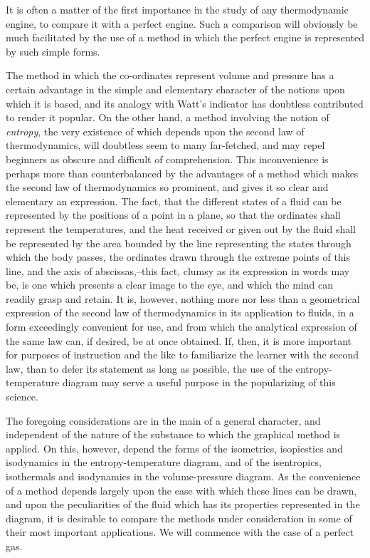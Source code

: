 \documentclass[11pt]{article}
\begin{document}
It is often a matter of the first importance in the study of any thermodynamic engine, to compare it with a perfect engine. Such a comparison will obviously be much facilitated by the use of a method in which the perfect engine is represented by such simple forms.

The method in which the co-ordinates represent volume and pressure has a certain advantage in the simple and elementary character of the notions upon which it is based, and its analogy with Watt's indicator has doubtless contributed to render it popular. On the other hand, a method involving the notion of \emph{entropy}, the very existence of which depends upon the second law of thermodynamics, will doubtless seem to many far-fetched, and may repel beginners as obscure and difficult of comprehension. This inconvenience is perhaps more than counterbalanced by the advantages of a method which makes the second law of thermodynamics so prominent, and gives it so clear and elementary an expression. The fact, that the different states of a fluid can be represented by the positions of a point in a plane, so that the ordinates shall represent the temperatures, and the heat received or given out by the fluid shall be represented by the area bounded by the line representing the states through which the body passes, the ordinates drawn through the extreme points of this line, and the axis of abscissas,--this fact, clumsy as its expression in words may be, is one which presents a clear image to the eye, and which the mind can readily grasp and retain. It is, however, nothing more nor less than a geometrical expression of the second law of thermodynamics in its application to fluids, in a form exceedingly convenient for use, and from which the analytical expression of the same law can, if desired, be at once obtained. If, then, it is more important for purposes of instruction and the like to familiarize the learner with the second law, than to defer its statement as long as possible, the use of the entropy-temperature diagram may serve a useful purpose in the popularizing of this science.

The foregoing considerations are in the main of a general character, and independent of the nature of the substance to which the graphical method is applied. On this, however, depend the forms of the isometrics, isopiestics and isodynamics in the entropy-temperature diagram, and of the isentropics, isothermals and isodynamics in the volume-pressure diagram. As the convenience of a method depends largely upon the ease with which these lines can be drawn, and upon the peculiarities of the fluid which has its properties represented in the diagram, it is desirable to compare the methods under consideration in some of their most important applications. We will commence with the case of a perfect gas.
\end{document}
